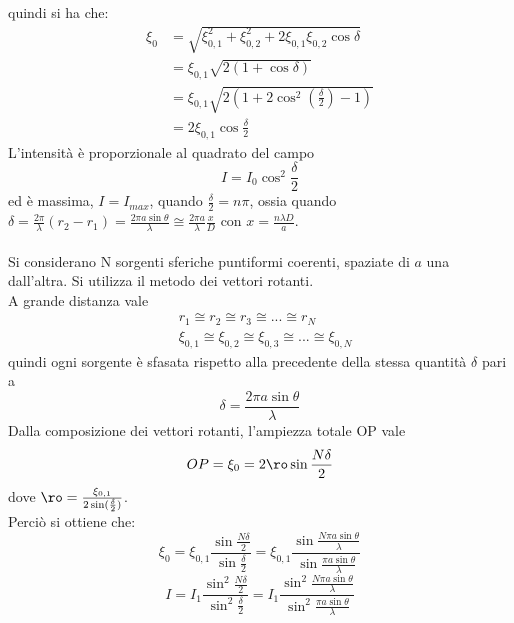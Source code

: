 \documentclass{article}
\begin{document}
quindi si ha che:
\begin{equation}
\begin{split}
    \xi_0&=\sqrt{\xi_{0,1}^2+\xi_{0,2}^2 +2\xi_{0,1}\xi_{0,2}\cos\delta}\\
    &=\xi_{0,1}\sqrt{2(1+\cos\delta)}\\
    &=\xi_{0,1}\sqrt{2\left(1+2\cos^2\left(\frac{\delta}{2}\right)-1\right)}\\
    &=2\xi_{0,1}\cos\frac{\delta}{2}
    \nonumber
\end{split}
\end{equation}
L’intensità è proporzionale al quadrato del campo
\begin{equation}
    I=I_0\cos^2\frac{\delta}{2}
    \nonumber
\end{equation}
ed è massima, $I=I_{max}$, quando $\frac{\delta}{2}=n\pi$, ossia quando $\delta=\frac{2\pi}{\lambda}(r_2-r_1)=\frac{2\pi a\sin\theta}{\lambda} \cong \frac{2\pi a}{\lambda}\frac{x}{D}$ con $x=\frac{n\lambda D}{a}$.\\
\\
Si considerano N sorgenti sferiche puntiformi coerenti, spaziate di $a$ una dall’altra. Si utilizza il metodo dei vettori rotanti.\\
A grande distanza vale 
\begin{equation}
\begin{split}
    &r_1\cong r_2\cong r_3\cong ...\cong r_N \\
    &\xi_{0,1}\cong \xi_{0,2}\cong \xi_{0,3}\cong ...\cong \xi_{0,N}
    \nonumber
\end{split}
\end{equation}
quindi ogni sorgente è sfasata rispetto alla precedente della stessa
quantità $\delta$ pari a
\begin{equation}
    \delta=\frac{2\pi a\sin\theta}{\lambda}
    \nonumber
\end{equation}
Dalla composizione dei vettori rotanti, l’ampiezza totale OP vale
\begin{equation}
    OP=\xi_0=2\ro\sin\frac{N\delta}{2}
    \nonumber
\end{equation}
dove $\ro=\frac{\xi_{0,1}}{2\sin(\frac{\delta}{2})}$.\\
Perciò si ottiene che:
\begin{equation}
    \xi_0=\xi_{0,1}\frac{\sin\frac{N\delta}{2}}{\sin\frac{\delta}{2}}=\xi_{0,1}\frac{\sin\frac{N\pi a\sin\theta}{\lambda}}{\sin\frac{\pi a\sin\theta}{\lambda}}
    \nonumber
\end{equation}
\begin{equation}
    I=I_1\frac{\sin^2\frac{N\delta}{2}}{\sin^2\frac{\delta}{2}}=I_1\frac{\sin^2\frac{N\pi a\sin\theta}{\lambda}}{\sin^2\frac{\pi a\sin\theta}{\lambda}}
    \nonumber
\end{equation}
\end{document}
